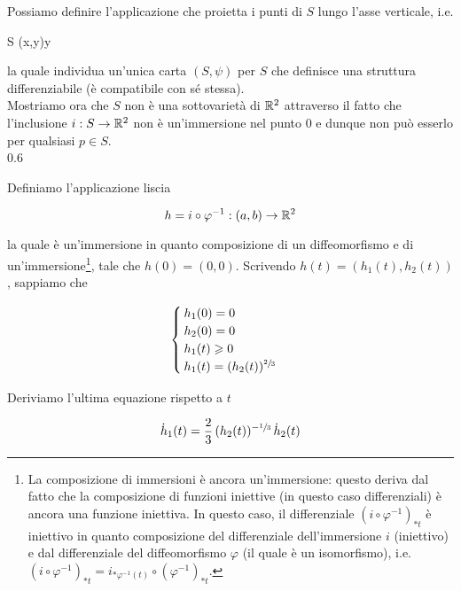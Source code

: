 Possiamo definire l'applicazione che proietta i punti di $ S $ lungo l'asse verticale, i.e.

\map{\psi}
	{S}{\R}
	{(x,y)}{y}

la quale individua un'unica carta $ (S,\psi) $ per $ S $ che definisce una struttura differenziabile (è compatibile con sé stessa). \\
Mostriamo ora che $ S $ non è una sottovarietà di $ \mathbb{R}^{2} $ attraverso il fatto che l'inclusione $ i : S \to \mathbb{R}^{2} $ non è un'immersione nel punto 0 e dunque non può esserlo per qualsiasi $ p \in S $. \\

	{0.6}{%
			}

Definiamo l'applicazione liscia

\begin{equation}
	h = i \circ \varphi^{-1} : (a,b) \to \mathbb{R}^{2}
\end{equation}

la quale è un'immersione in quanto composizione di un diffeomorfismo e di un'immersione\footnote{%
	La composizione di immersioni è ancora un'immersione: questo deriva dal fatto che la composizione di funzioni iniettive (in questo caso differenziali) è ancora una funzione iniettiva. In questo caso, il differenziale $ (i \circ \varphi^{-1})_{*t} $ è iniettivo in quanto composizione del differenziale dell'immersione $ i $ (iniettivo) e dal differenziale del diffeomorfismo $ \varphi $ (il quale è un isomorfismo), i.e. $ (i \circ \varphi^{-1})_{*t} = i_{*\varphi^{-1}(t)} \circ (\varphi^{-1})_{*t} $.%
}, tale che $ h(0)=(0,0) $. Scrivendo $ h(t) = (h_{1}(t),h_{2}(t)) $, sappiamo che

\begin{equation}
	\begin{cases}
		h_{1}(0) = 0 \\
		h_{2}(0) = 0 \\
		h_{1}(t) \geqslant 0 \\
		h_{1}(t) = (h_{2}(t))^{\sfrac{2}{3}}
	\end{cases}
\end{equation}

Deriviamo l'ultima equazione rispetto a $ t $

\begin{equation}
	\dot{h}_{1}(t) = \dfrac{2}{3} \, (h_{2}(t))^{-\sfrac{1}{3}} \, \dot{h}_{2}(t)
\end{equation}

